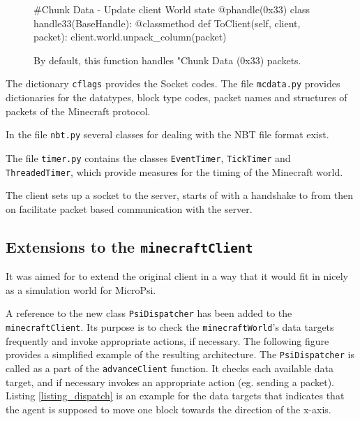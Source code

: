 		\begin{figure}[ht]
			\centering
			\begin{minipage}{11cm}
				\begin{pseudocode}
#Chunk Data - Update client World state
@phandle(0x33)
class handle33(BaseHandle):
	@classmethod
	def ToClient(self, client, packet):
		client.world.unpack_column(packet)
					\end{pseudocode}
				\caption{By default, this function handles "Chunk Data (0x33) packets.}
				\label{packet_handling}
			\end{minipage}
		\end{figure}

The dictionary \texttt{cflags} provides the Socket codes.
The file \texttt{mcdata.py} provides dictionaries for the datatypes, block type codes, packet names and structures of packets of the Minecraft protocol.

In the file \texttt{nbt.py} several classes for dealing with the NBT file format exist.

The file \texttt{timer.py} contains the classes \texttt{EventTimer}, \texttt{TickTimer} and \texttt{ThreadedTimer}, which provide measures for the timing of the Minecraft world.

The client sets up a socket to the server, starts of with a handshake to from then on facilitate packet based communication with the server.

        \subsection{Extensions to the \texttt{minecraftClient}}
        \label{extensions_client}
It was aimed for to extend the original client in a way that it would fit in nicely as a simulation world for MicroPsi.
        
A reference to the new class \texttt{PsiDispatcher} has been added to the \texttt{minecraftClient}. Its purpose is to check the \texttt{minecraftWorld}'s data targets frequently and invoke appropriate actions, if necessary. The following figure provides a simplified example of the resulting architecture. The \texttt{PsiDispatcher} is called as a part of the \texttt{advanceClient} function. It checks each available data target, and if necessary invokes an appropriate action (eg. sending a packet). Listing \ref{listing_dispatch} is an example for the data targets that indicates that the agent is supposed to move one block towards the direction of the x-axis. %

